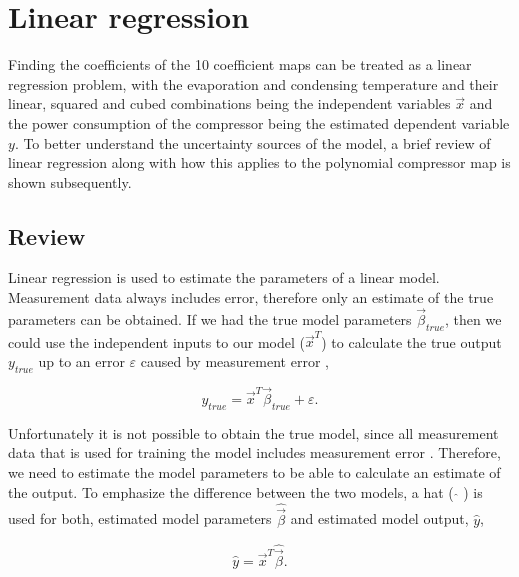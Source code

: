 \section{Linear regression}
\label{sec:linear_regression}
Finding the coefficients of the 10 coefficient maps can be treated as a linear regression problem, with the evaporation and condensing temperature and their linear, squared and cubed combinations being the independent variables ${\vec x}$ and the power consumption of the compressor being the estimated dependent variable $y$. To better understand the uncertainty sources of the model, a brief review of linear regression along with how this applies to the polynomial compressor map is shown subsequently.

\subsection{Review}
\label{sec:linreg_review}
Linear regression is used to estimate the parameters of a linear model.  Measurement data always includes error, therefore only an estimate of the true parameters can be obtained. If we had the true model parameters ${\vec \beta _{true}} $, then we could use the independent inputs to our model (${\vec x^T}$) to calculate the true output $y_{true}$ up to an error $\varepsilon$ caused by measurement error ,

\begin{equation}
{y_{true}} = {\vec x^T}{\vec \beta _{true}} + \varepsilon .
\label{eq:true_lin_model}
\end{equation}

Unfortunately it is not possible to obtain the true model, since all measurement data that is used for training the model includes measurement error . Therefore, we need to estimate the model parameters to be able to calculate an estimate of the output. To emphasize the difference between the two models, a hat ( $\hat{}$ ) is used for both, estimated model parameters $\hat {\vec \beta}$ and estimated model output, $\hat y$,

\begin{equation}
\hat y = {\vec x^T}\hat {\vec \beta}.
\label{eq:estimted_lin_model}
\end{equation}

